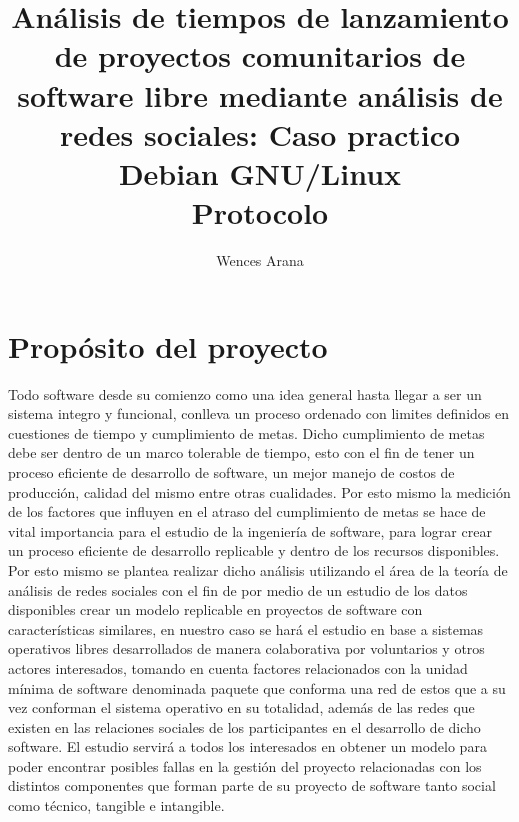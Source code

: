 \documentclass[12pt]{report}
\begin{document}
\title{ {Análisis de tiempos de lanzamiento de proyectos comunitarios
    de software libre mediante análisis de redes sociales: Caso
    practico Debian GNU/Linux}\\ {Protocolo} } \author{Wences Arana}
\maketitle

\tableofcontents
\chapter*{Propósito del proyecto}

Todo software desde  su comienzo como una idea general  hasta llegar a
ser un sistema  integro y funcional, conlleva un  proceso ordenado con
limites  definidos   en  cuestiones   de  tiempo  y   cumplimiento  de
metas.  Dicho  cumplimiento de  metas  debe  ser  dentro de  un  marco
tolerable de tiempo, esto con el  fin de tener un proceso eficiente de
desarrollo  de software,  un  mejor manejo  de  costos de  producción,
calidad del mismo  entre otras cualidades. Por esto  mismo la medición
de los factores que influyen en el atraso del cumplimiento de metas se
hace  de  vital  importancia  para  el estudio  de  la  ingeniería  de
software,  para  lograr  crear  un  proceso  eficiente  de  desarrollo
replicable y  dentro de  los recursos disponibles.  Por esto  mismo se
plantea realizar  dicho análisis  utilizando el área  de la  teoría de
análisis de redes  sociales con el fin  de por medio de  un estudio de
los  datos disponibles  crear  un modelo  replicable  en proyectos  de
software con  características similares,  en nuestro  caso se  hará el
estudio en base  a sistemas operativos libres  desarrollados de manera
colaborativa por  voluntarios y otros actores  interesados, tomando en
cuenta  factores  relacionados  con   la  unidad  mínima  de  software
denominada  paquete  que conforma  una  red  de  estos  que a  su  vez
conforman el  sistema operativo en  su totalidad, además de  las redes
que  existen en  las relaciones  sociales de  los participantes  en el
desarrollo  de  dicho  software.  El   estudio  servirá  a  todos  los
interesados en obtener un modelo  para poder encontrar posibles fallas
en la gestión del proyecto  relacionadas con los distintos componentes
que forman parte de su proyecto de software tanto social como técnico,
tangible e intangible.
\end{document}
